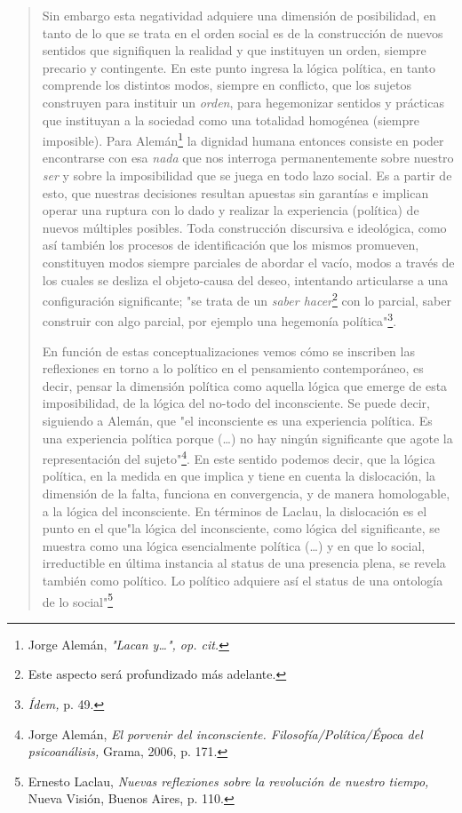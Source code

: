 \documentclass{book}
\begin{document}
\begin{quote}
Sin embargo esta negatividad adquiere una dimensión de posibilidad, en
tanto de lo que se trata en el orden social es de la construcción de
nuevos sentidos que signifiquen la realidad y que instituyen un orden,
siempre precario y contingente. En este punto ingresa la lógica
política, en tanto comprende los distintos modos, siempre en conflicto,
que los sujetos construyen para instituir un \emph{orden}, para
hegemonizar sentidos y prácticas que instituyan a la sociedad como una
totalidad homogénea (siempre imposible). Para Alemán\footnote{Jorge
  Alemán, \emph{"Lacan y\ldots", op. cit.}} la dignidad humana entonces
consiste en poder encontrarse con esa \emph{nada} que nos interroga
permanentemente sobre nuestro \emph{ser} y sobre la imposibilidad que se
juega en todo lazo social. Es a partir de esto, que nuestras decisiones
resultan apuestas sin garantías e implican operar una ruptura con lo
dado y realizar la experiencia (política) de nuevos múltiples posibles.
Toda construcción discursiva e ideológica, como así también los procesos
de identificación que los mismos promueven, constituyen modos siempre
parciales de abordar el vacío, modos a través de los cuales se desliza
el objeto-causa del deseo, intentando articularse a una configuración
significante; "se trata de un \emph{saber hacer}\footnote{Este aspecto
  será profundizado más adelante.} con lo parcial, saber construir con
algo parcial, por ejemplo una hegemonía política"\footnote{\emph{Ídem,}
  p. 49.}.

En función de estas conceptualizaciones vemos cómo se inscriben las
reflexiones en torno a lo político en el pensamiento contemporáneo, es
decir, pensar la dimensión política como aquella lógica que emerge de
esta imposibilidad, de la lógica del no-todo del inconsciente. Se puede
decir, siguiendo a Alemán, que "el inconsciente es una experiencia
política. Es una experiencia política porque (\dots) no hay ningún
significante que agote la representación del sujeto"\footnote{Jorge
  Alemán, \emph{El porvenir del inconsciente. Filosofía/Política/Época
  del psicoanálisis,} Grama, 2006, p. 171.}. En este sentido podemos
decir, que la lógica política, en la medida en que implica y tiene en
cuenta la dislocación, la dimensión de la falta, funciona en
convergencia, y de manera homologable, a la lógica del inconsciente. En
términos de Laclau, la dislocación es el punto en el que"la lógica del
inconsciente, como lógica del significante, se muestra como una lógica
esencialmente política (\dots) y en que lo social, irreductible en
última instancia al status de una presencia plena, se revela también
como político. Lo político adquiere así el status de una ontología de lo
social"\footnote{Ernesto Laclau, \emph{Nuevas reflexiones sobre la
  revolución de nuestro tiempo,} Nueva Visión, Buenos Aires, p. 110.}
\end{quote}
\end{document}
